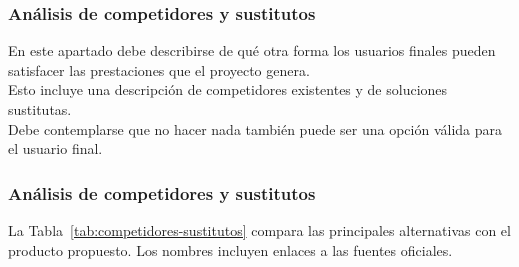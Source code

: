 \subsubsection{Análisis de competidores y sustitutos}
{\consigna
En este apartado debe describirse de qué otra forma los usuarios finales pueden satisfacer las prestaciones que el proyecto genera.\\
Esto incluye una descripción de competidores existentes y de soluciones sustitutas.\\
Debe contemplarse que no hacer nada también puede ser una opción válida para el usuario final.
}

\subsubsection{Análisis de competidores y sustitutos}

La Tabla~\ref{tab:competidores-sustitutos} compara las principales
alternativas con el producto propuesto. Los nombres incluyen
enlaces a las fuentes oficiales.

